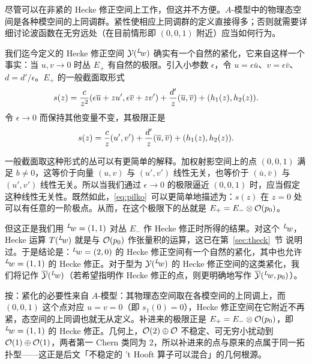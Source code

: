 尽管可以在非紧的 Hecke 修正空间上工作，但这并不方便。$A$-模型中的物理态空间是各种模空间的上同调群。紧性使相应上同调群的定义直接得多；否则就需要详细讨论波函数在无穷远处（在目前情形即 $(0,0,1)$ 附近）应当如何行为。

我们迄今定义的 Hecke 修正空间 ${{\EUY}}(^L\negthinspace w)$ 确实有一个自然的紧化，它来自这样一个事实：当 $u,v\to 0$ 时丛 $E_+$ 有自然的极限。引入小参数 $\epsilon$，令 $u=\epsilon \bar u$、$v=\epsilon \bar v$、$d=d'/\epsilon$。$E_+$ 的一般截面取形式 %
\setcounter{equation}{19}
\begin{equation}\label{eq:gilko}
s(z)={c\over
z^2}(\epsilon \bar u+zu',\epsilon \bar v+zv')+{d'\over z} (\bar
u,\bar v)+(h_1(z),h_2(z)).
\end{equation}
令 $\epsilon\to 0$ 而保持其他变量不变，其极限正是 %
\setcounter{equation}{20}
\begin{equation}\label{eq:pilko}
s(z)={c\over z}(u',v')+{d'\over z}(\bar u,\bar
v)+(h_1(z),h_2(z)).
\end{equation}

一般截面取这种形式的丛可以有更简单的解释。加权射影空间上的点 $(0,0,1)$ 满足 $b\not=0$，这等价于向量 $(u,v)$ 与 $(u',v')$ 线性无关，也等价于 $(\bar u,\bar v)$ 与 $(u',v')$ 线性无关。所以当我们通过 $\epsilon\to 0$ 的极限逼近 $(0,0,1)$ 时，应当假定这种线性无关性。既然如此，\eqref{eq:pilko}\ 可以更简单地描述为：$s(z)$ 在 $z=0$ 处可以有任意的一阶极点。从而，在这个极限下的丛就是 $E_+=E_-\otimes {\cal O}(p_0)$。

但这正是我们用 $^L\negthinspace w=(1,1)$ 对丛 $E_-$ 作 Hecke 修正时所得的结果。对这个 $^L\negthinspace w$，Hecke 运算 $T(^L\negthinspace w)$ 就是与 ${\cal O}(p_0)$ 作张量积的运算，这已在第~\ref{sec:theck}~节 说明过。于是结论是：$^L\negthinspace w=(2,0)$ 的 Hecke 修正空间有一个自然的紧化，其中也允许 $^L\negthinspace w=(1,1)$ 的 Hecke 修正。对于型为 ${{\EUY}}(^L\negthinspace w)$ 的 Hecke 修正空间的这类紧化，我们将记作 $\bar {{\EUY}}(^L\negthinspace w)$（若希望指明作 Hecke 修正的点，则更明确地写作 $\bar {{\EUY}}(^L\negthinspace w,p_0)$）。

\begin{yizhu}[物理图像]
按：紧化的必要性来自 $A$-模型：其物理态空间取在各模空间的上同调上，而 $(0,0,1)$ 这个点对应 $u=v=0$（即 $s_1(0)=0$），Hecke 修正空间在它附近不再紧，态空间的上同调也就无从定义。补进来的极限正是 $E_+=E_-\otimes{\cal O}(p_0)$，即 $^L\negthinspace w=(1,1)$ 的 Hecke 修正。几何上，${\cal O}(2)\oplus{\cal O}$ 不稳定、可无穷小扰动到 ${\cal O}(1)\oplus{\cal O}(1)$，两者第一 Chern 类同为 $2$，所以补进来的点与原来的点属于同一拓扑型——这正是后文「不稳定的 't Hooft 算子可以混合」的几何根源。
\end{yizhu}

